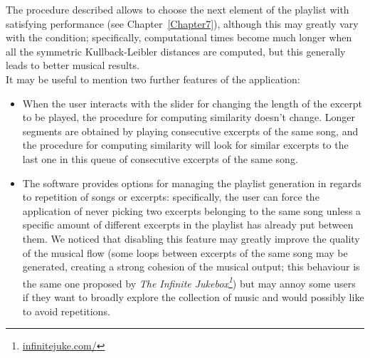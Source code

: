 The procedure described allows to choose the next element of the playlist with satisfying performance (see Chapter~\ref{Chapter7}), although this may greatly vary with the condition; specifically, computational times become much longer when all the symmetric Kullback-Leibler distances are computed, but this generally leads to better musical results. \\
It may be useful to mention two further features of the application:
\begin{itemize}
\item When the user interacts with the slider for changing the length of the excerpt to be played, the procedure for computing similarity doesn't change. Longer segments are obtained by playing consecutive excerpts of the same song, and the procedure for computing similarity will look for similar excerpts to the last one in this queue of consecutive excerpts of the same song.
\item The software provides options for managing the playlist generation in regards to repetition of songs or excerpts: specifically, the user can force the application of never picking two excerpts belonging to the same song unless a specific amount of different excerpts in the playlist has already put between them. We noticed that disabling this feature may greatly improve the quality of the musical flow (some loops between excerpts of the same song may be generated, creating a strong cohesion of the musical output; this behaviour is the same one proposed by \textit{The Infinite Jukebox\footnote{\url{infinitejuke.com/}}}) but may annoy some users if they want to broadly explore the collection of music and would possibly like to avoid repetitions.
\end{itemize}


